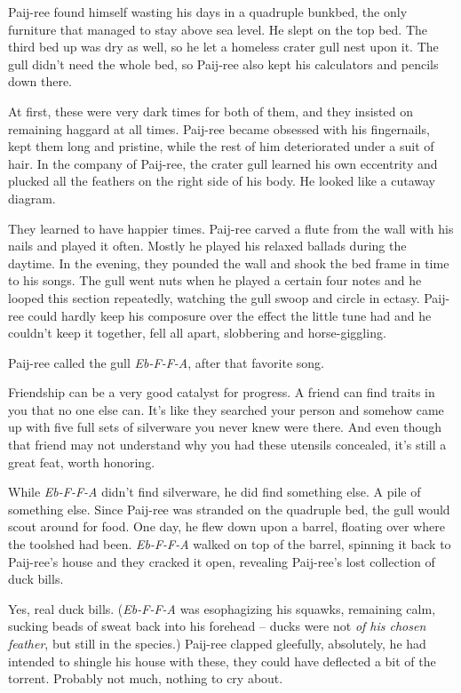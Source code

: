 \documentclass[10pt,twoside]{report}
\begin{document}
Paij-ree found himself wasting his days in a quadruple bunkbed, the
only furniture that managed to stay above sea level.  He slept on the
top bed.  The third bed up was dry as well, so he let a homeless
crater gull nest upon it.  The gull didn't need the whole bed, so
Paij-ree also kept his calculators and pencils down there.

At first, these were very dark times for both of them, and they
insisted on remaining haggard at all times.  Paij-ree became obsessed
with his fingernails, kept them long and pristine, while the rest of
him deteriorated under a suit of hair.  In the company of Paij-ree,
the crater gull learned his own eccentrity and plucked all the
feathers on the right side of his body.  He looked like a cutaway
diagram.

They learned to have happier times.  Paij-ree carved a flute from the
wall with his nails and played it often.  Mostly he played his relaxed
ballads during the daytime.  In the evening, they pounded the wall and
shook the bed frame in time to his songs.  The gull went nuts when he
played a certain four notes and he looped this section repeatedly,
watching the gull swoop and circle in ectasy.  Paij-ree could hardly
keep his composure over the effect the little tune had and he couldn't
keep it together, fell all apart, slobbering and horse-giggling.

Paij-ree called the gull {\em Eb-F-F-A}, after that favorite song.

Friendship can be a very good catalyst for progress.  A friend can
find traits in you that no one else can.  It's like they searched your
person and somehow came up with five full sets of silverware you never
knew were there.  And even though that friend may not understand why
you had these utensils concealed, it's still a great feat, worth
honoring.

While {\em Eb-F-F-A} didn't find silverware, he did find something
else.  A pile of something else.  Since Paij-ree was stranded on the
quadruple bed, the gull would scout around for food.  One day, he flew
down upon a barrel, floating over where the toolshed had been.  {\em
  Eb-F-F-A} walked on top of the barrel, spinning it back to
Paij-ree's house and they cracked it open, revealing Paij-ree's lost
collection of duck bills.

Yes, real duck bills. ({\em Eb-F-F-A} was esophagizing his squawks,
remaining calm, sucking beads of sweat back into his forehead -- ducks
were not {\em of his chosen feather}, but still in the species.)
Paij-ree clapped gleefully, absolutely, he had intended to shingle his
house with these, they could have deflected a bit of the
torrent. Probably not much, nothing to cry about.
\end{document}
